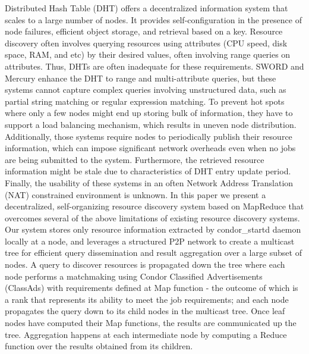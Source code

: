 \documentclass{acm_proc_article-sp}
\begin{document}
Distributed Hash Table (DHT)\cite{chord}\cite{pastry} offers a decentralized information system that scales to a large number of nodes. 
It provides self-configuration in the presence of node failures, efficient object storage, and retrieval based on a key. 
Resource discovery often involves querying resources using attributes (CPU speed, disk space, RAM, and etc) by their desired values, often involving range queries on attributes. 
Thus, DHTs are often inadequate for these requirements. 
SWORD\cite{sword} and Mercury\cite{mercury} enhance the DHT to range and multi-attribute queries, but these systems cannot capture complex queries involving unstructured data, such as partial string matching or regular expression matching. 
To prevent hot spots where only a few nodes might end up storing bulk of information, they have to support a load balancing mechanism, which results in uneven node distribution.
Additionally, those systems require nodes to periodically publish their resource information, which can impose significant network overheads even when no jobs are being submitted to the system. 
Furthermore, the retrieved resource information might be stale due to characteristics of DHT entry update period. 
Finally, the usability of these systems in an often Network Address Translation (NAT) constrained environment is unknown. 
In this paper we present a decentralized, self-organizing resource discovery system based on MapReduce that overcomes several of the above limitations of existing resource discovery systems. 
Our system stores only resource information extracted by condor\_startd daemon\cite{condor} locally at a node, 
and leverages a structured P2P network to create a multicast tree for efficient query dissemination and result aggregation over a large subset of nodes. 
A query to discover resources is propagated down the tree where each node performs a matchmaking using Condor Classified Advertisements (ClassAds)\cite{classad} with requirements defined at Map function - the outcome of which is a rank that represents its ability to meet the job requirements; 
and each node propagates the query down to its child nodes in the multicast tree. 
Once leaf nodes have computed their Map functions, the results are communicated up the tree. 
Aggregation happens at each intermediate node by computing a Reduce function over the results obtained from its children. 
\end{document}
